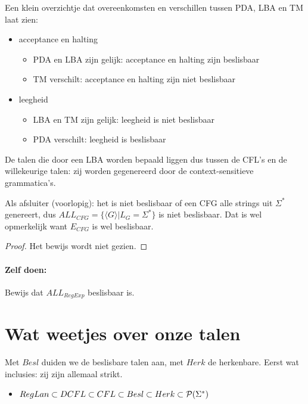 Een klein overzichtje dat overeenkomsten en verschillen tussen PDA,
LBA en TM laat zien:
\begin{itemize}
\item acceptance en halting
\begin{itemize}
\item PDA en LBA zijn gelijk: acceptance en halting zijn beslisbaar
\item TM verschilt: acceptance en halting zijn niet beslisbaar
\end{itemize}
\item leegheid
\begin{itemize}
\item LBA en TM zijn gelijk: leegheid is niet beslisbaar
\item PDA verschilt: leegheid is beslisbaar
\end{itemize}
\end{itemize}
De talen die door een LBA worden bepaald liggen dus tussen de CFL's en
de willekeurige talen: zij worden gegenereerd door de
context-sensitieve grammatica's.  

Als afsluiter (voorlopig): het is niet beslisbaar of een CFG alle
strings uit $\Sigma^*$ genereert, dus $ALL_{CFG} = \{\langle G \rangle|L_G =
\Sigma^*\}$ is niet beslisbaar. Dat is wel opmerkelijk want $E_{CFG}$
is wel beslisbaar.

\begin{proof}
Het bewijs wordt niet gezien.
\end{proof}


\paragraph{Zelf doen:} Bewijs dat $ALL_{RegExp}$ beslisbaar is.

\section{Wat weetjes over onze talen}

Met $Besl$ duiden we de beslisbare talen aan, met $Herk$ de
herkenbare. Eerst wat inclusies: zij zijn allemaal strikt.

\begin{itemize}
\item[] $RegLan \subset DCFL \subset CFL \subset Besl \subset Herk
\subset {\cal P}(\Sigma^*)$
\end{itemize}

